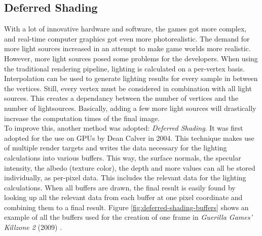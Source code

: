 \subsection*{Deferred Shading} \label{subsec-deferred-rendering}

With a lot of innovative hardware and software, the games got more complex, and real-time computer graphics got even 
more photorealistic. The demand for more light sources increased in an attempt to make game worlds more realistic. 
However, more light sources posed some problems for the developers. When using the traditional rendering pipeline, 
lighting is calculated on a per-vertex basis. Interpolation can be used to generate lighting results for every sample 
in between the vertices. Still, every vertex must be considered in combination with all light sources. This creates a 
dependancy between the number of vertices and the number of lightsources. Basically, adding a few more light sources 
will drastically increase the computation times of the final image. \\

\noindent
To improve this, another method was adopted: \emph{Deferred Shading}. It was first adopted for the use on \ac{GPU}s 
by Dean Calver \cite{Calver2004} in 2004. This technique makes use of multiple render targets and writes the data 
necessary for the lighting calculations into various buffers. This way, the surface normals, the specular intensity, 
the albedo (texture color), the depth and more values can all be stored individually, as per-pixel data. This includes 
the relevant data for the lighting calculations. When all buffers are drawn, the final result is easily found by 
looking up all the relevant data from each buffer at one pixel coordinate and combining them to a final result. 
Figure \ref{fig:deferred-shading-buffers} shows an example of all the buffers used for the creation of one frame in 
\emph{Guerilla Games'} \emph{Killzone 2} (2009) \cite{KillzoneFandom}. 

